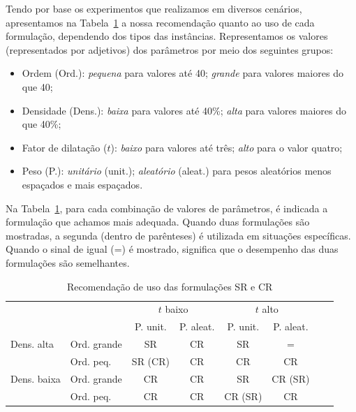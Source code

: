 Tendo por base os experimentos que realizamos em diversos cenários,
apresentamos na Tabela~\ref{tab:conc_alg_exato} a nossa recomendação
quanto ao uso de cada formulação, dependendo dos tipos das
instâncias. Representamos os valores (representados por adjetivos) dos
parâmetros por meio dos seguintes grupos:
\begin{itemize}
\item Ordem (Ord.): \emph{pequena} para valores até 40; \emph{grande} para
  valores maiores do que 40;
\item Densidade (Dens.): \emph{baixa} para valores até 40\%; \emph{alta}
  para valores maiores do que 40\%;
\item Fator de dilatação ($t$): \emph{baixo} para valores até três; \emph{alto} para
  o valor quatro;
\item Peso (P.): \emph{unitário} (unit.); \emph{aleatório} (aleat.) para
  pesos aleatórios menos espaçados e mais espaçados.
\end{itemize}

Na Tabela~\ref{tab:conc_alg_exato}, para cada combinação de valores de
parâmetros, é indicada a formulação que achamos mais adequada. Quando
duas formulações são mostradas, a segunda (dentro de parênteses) é utilizada em
situações específicas. Quando o sinal de igual (=) é mostrado,
significa que o desempenho das duas formulações são semelhantes.

\begin{table}
\centering

\begin{tabular}{llcccccc}
\toprule
& & \multicolumn{2}{c}{$t$ baixo} & \multicolumn{2}{c}{$t$ alto}\\
\cmidrule[0.05ex]{3-6}
& & P. unit. & P. aleat. & P. unit. & P. aleat. \\
\midrule[0.1ex]
Dens. alta & Ord. grande & SR & CR & SR & = \\ 
    &  Ord. peq. & SR (CR) & CR & CR & CR \\
\addlinespace
Dens. baixa & Ord. grande & CR & CR & SR & CR (SR) \\ 
    & Ord. peq. & CR & CR & CR (SR) & CR \\ 
\bottomrule
\end{tabular}
\caption{Recomendação de uso das formulações SR e CR}\label{tab:conc_alg_exato}
\end{table}

